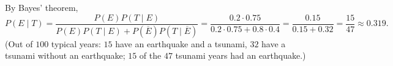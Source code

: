 By Bayes' theorem,
\[
P(E\mid T)=\dfrac{P(E)P(T\mid E)}{P(E)P(T\mid E)+P(\overline E)P(T\mid\overline E)}=\dfrac{0.2\cdot0.75}{0.2\cdot0.75+0.8\cdot0.4}=\dfrac{0.15}{0.15+0.32}=\boxed{\dfrac{15}{47}}\approx0.319 .
\]
(Out of $100$ typical years: $15$ have an earthquake and a tsunami, $32$ have a tsunami without an earthquake; $15$ of the $47$ tsunami years had an earthquake.)
